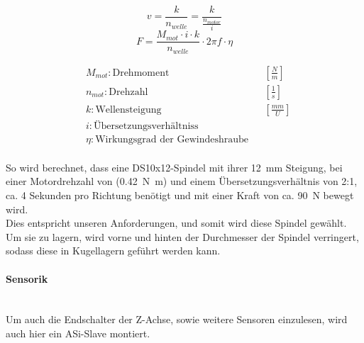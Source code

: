 \vspace{5mm}
\noindent\begin{minipage}{\textwidth}
\begin{minipage}[t]{0.5\textwidth}
    \vspace{10mm}
    \begin{equation*}
        v = \frac{k}{n_{welle}} = \frac{k}{\frac{n_{motor}}{i}}
    \end{equation*}
    \begin{equation*}
        F = \frac{M_{mot} \cdot i \cdot k}{n_{welle}} \cdot 2 \pi f \cdot \eta 
    \end{equation*}
\end{minipage}%
\begin{minipage}[t]{0.5\textwidth}
    \vspace{-7mm}
    \begin{align*}
        &M_{mot}: \text{Drehmoment} & &\left[\frac{N}{m}\right]\\
        &n_{mot}: \text{Drehzahl} & &\left[\frac{1}{s}\right]\\
        &k: \text{Wellensteigung} & &\left[\frac{mm}{U}\right]\\
        &i: \text{Übersetzungsverhältniss} & \\
        &\eta: \text{Wirkungsgrad der Gewindeshraube} & \\
    \end{align*}
\end{minipage}
\end{minipage}

\vspace{5mm}

So wird berechnet, dass eine DS10x12-Spindel mit ihrer \SI{12}{\mm} Steigung, bei einer Motordrehzahl von  (\SI{0.42}{\newton\meter}) und einem Übersetzungsverhältnis von 2:1, ca. 4 Sekunden pro Richtung benötigt und mit einer Kraft von ca. \SI{90}{\newton} bewegt wird.\\
Dies entspricht unseren Anforderungen, und somit wird diese Spindel gewählt. Um sie zu lagern, wird vorne und hinten der Durchmesser der Spindel verringert, sodass diese in Kugellagern geführt werden kann.

\paragraph{Sensorik}\mbox{}\\
Um auch die Endschalter der Z-Achse, sowie weitere Sensoren einzulesen, wird auch hier ein ASi-Slave montiert.


